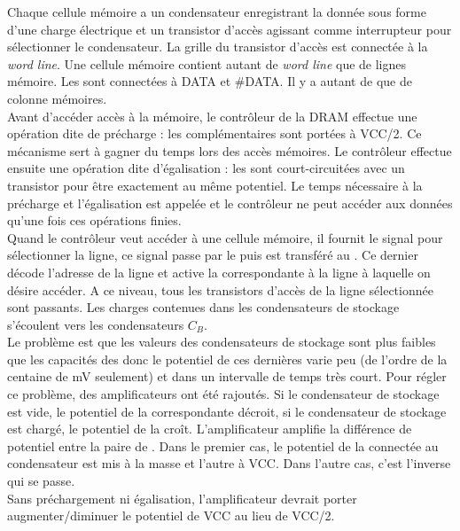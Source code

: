\begin{itemize}
	      Chaque cellule mémoire a un condensateur enregistrant la donnée sous forme d'une charge électrique et un transistor d'accès agissant comme interrupteur pour sélectionner le condensateur.
	      La grille du transistor d'accès est connectée à la \textit{word line}. Une cellule mémoire contient autant de \textit{word line} que de lignes mémoire.
	      Les  sont connectées à DATA et \#DATA. Il y a autant de  que de colonne mémoires. \\
	      Avant d'accéder accès à la mémoire, le contrôleur de la DRAM effectue une opération dite de précharge : les  complémentaires sont portées à VCC/2.
	      Ce mécanisme sert à gagner du temps lors des accès mémoires. Le contrôleur effectue ensuite une opération dite d'égalisation : les  sont court-circuitées avec un transistor pour être exactement au même potentiel.
	      Le temps nécessaire à la précharge et l'égalisation est appelée  et le contrôleur ne peut accéder aux données qu'une fois ces opérations finies. \\
	      Quand le contrôleur veut accéder à une cellule mémoire, il fournit le signal  pour sélectionner la ligne, ce signal passe par le  puis est transféré au .
	      Ce dernier décode l'adresse de la ligne et active la  correspondante à la ligne à laquelle on désire accéder. 
	      A ce niveau, tous les transistors d'accès de la ligne sélectionnée sont passants.
	      Les charges contenues dans les condensateurs de stockage s'écoulent vers les condensateurs \(C_B\). \\
	      Le problème est que les valeurs des condensateurs de stockage sont plus faibles que les capacités des  donc le potentiel de ces dernières varie peu (de l'ordre de la centaine de mV seulement) et dans un intervalle de temps très court.
	      Pour régler ce problème, des amplificateurs ont été rajoutés.
	      Si le condensateur de stockage est vide, le potentiel de la  correspondante décroit, si le condensateur de stockage est chargé, le potentiel de la  croît.
	      L'amplificateur amplifie la différence de potentiel entre la paire de .
	      Dans le premier cas, le potentiel de la  connectée au condensateur est mis à la masse et l'autre à VCC.
	      Dans l'autre cas, c'est l'inverse qui se passe. \\
	      Sans préchargement ni égalisation, l'amplificateur devrait porter augmenter/diminuer le potentiel de VCC au lieu de VCC/2. \\

\end{itemize}
